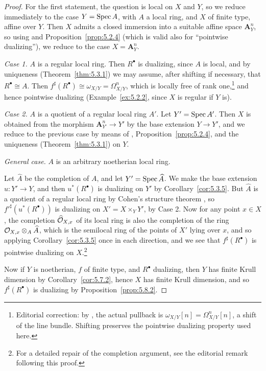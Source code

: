 \begin{proof}
For the first statement, the question is local on $X$ and $Y$, so we reduce immediately to the case $Y=\operatorname{Spec} A$, with $A$ a local ring, and $X$ of finite type, affine over $Y$. Then $X$ admits a closed immersion into a suitable affine space $\mathbf{A}_{Y}^{n}$, so using  and Proposition~\ref{prop:5.2.4} (which is valid also for ``pointwise dualizing''), we reduce to the case $X=\mathbf{A}_{Y}^{n}$.

\medskip\noindent\textit{Case 1.} $A$ is a regular local ring. Then $R^\bullet$ is dualizing, since $A$ is local, and by uniqueness (Theorem~\ref{thm:5.3.1}) we may assume, after shifting if necessary, that $R^\bullet\cong A$. Then $f^{\sharp}(R^\bullet)\cong\omega_{X/Y}=\Omega_{X/Y}^{n}$, which is locally free of rank one,\footnote{Editorial correction: by , the actual pullback is $\omega_{X/Y}[n]=\Omega^n_{X/Y}[n]$, a shift of the line bundle. Shifting preserves the pointwise dualizing property used here.} and hence pointwise dualizing (Example~\ref{ex:5.2.2}, since $X$ is regular if $Y$ is).

\medskip\noindent\textit{Case 2.} $A$ is a quotient of a regular local ring $A'$. Let $Y'=\operatorname{Spec} A'$. Then $X$ is obtained from the morphism $\mathbf{A}_{Y'}^{n}\to Y'$ by the base extension $Y\to Y'$, and we reduce to the previous case by means of , Proposition~\ref{prop:5.2.4}, and the uniqueness (Theorem~\ref{thm:5.3.1}) on $Y$.

\medskip\noindent\textit{General case.} $A$ is an arbitrary noetherian local ring.

Let $\widehat{A}$ be the completion of $A$, and let $Y'=\operatorname{Spec}\widehat{A}$. We make the base extension $u\colon Y'\to Y$, and then $u^{*}(R^\bullet)$ is dualizing on $Y'$ by Corollary~\ref{cor:5.3.5}. But $\widehat{A}$ is a quotient of a regular local ring by Cohen's structure theorem \cite[\nopp (31.1)]{14}, so $f'^{\sharp}(u^{*}(R^\bullet))$ is dualizing on $X' = X\times_{Y} Y'$, by Case 2. Now for any point $x\in X$, the completion $\widehat{\mathcal{O}}_{X,x}$ of its local ring is also the completion of the ring $\mathcal{O}_{X,x}\otimes_{A}\widehat{A}$, which is the semilocal ring of the points of $X'$ lying over $x$, and so applying Corollary~\ref{cor:5.3.5} once in each direction, and  we see that $f^{\sharp}(R^\bullet)$ is pointwise dualizing on $X$.\footnote{For a detailed repair of the completion argument, see the editorial remark following this proof.}

Now if $Y$ is noetherian, $f$ of finite type, and $R^\bullet$ dualizing, then $Y$ has finite Krull dimension by Corollary~\ref{cor:5.7.2}, hence $X$ has finite Krull dimension, and so $f^{\sharp}(R^\bullet)$ is dualizing by Proposition~\ref{prop:5.8.2}.
\end{proof}

